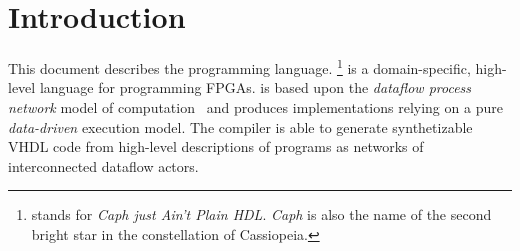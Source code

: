
\chapter{Introduction}
\label{chap:intro}

This document describes the \caph programming language.  \caph\footnote{\caph stands for \emph{Caph
    just Ain't Plain HDL}. \emph{Caph} is also the name of the second bright star in the
  constellation of Cassiopeia.} is a domain-specific, high-level language for programming FPGAs.
\caph is based upon the \emph{dataflow process network} model of computation~\cite{DPN} and
produces implementations relying on a pure \emph{data-driven} execution model.  The \caph compiler
is able to generate synthetizable VHDL code from high-level descriptions of programs as networks of
interconnected dataflow actors.

